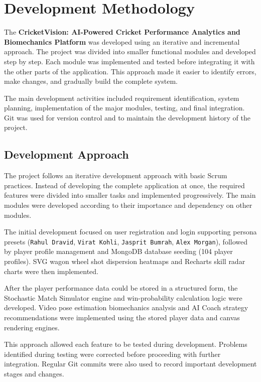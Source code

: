 \chapter{Development Methodology}

The \textbf{CricketVision: AI-Powered Cricket Performance Analytics and Biomechanics Platform} was developed using an iterative and incremental approach. The project was divided into smaller functional modules and developed step by step. Each module was implemented and tested before integrating it with the other parts of the application. This approach made it easier to identify errors, make changes, and gradually build the complete system.

The main development activities included requirement identification, system planning, implementation of the major modules, testing, and final integration. Git was used for version control and to maintain the development history of the project.

\section{Development Approach}
The project follows an iterative development approach with basic Scrum practices. Instead of developing the complete application at once, the required features were divided into smaller tasks and implemented progressively. The main modules were developed according to their importance and dependency on other modules.

The initial development focused on user registration and login supporting persona presets (\texttt{Rahul Dravid}, \texttt{Virat Kohli}, \texttt{Jasprit Bumrah}, \texttt{Alex Morgan}), followed by player profile management and MongoDB database seeding (104 player profiles). SVG wagon wheel shot dispersion heatmaps and Recharts skill radar charts were then implemented.

After the player performance data could be stored in a structured form, the Stochastic Match Simulator engine and win-probability calculation logic were developed. Video pose estimation biomechanics analysis and AI Coach strategy recommendations were implemented using the stored player data and canvas rendering engines.

This approach allowed each feature to be tested during development. Problems identified during testing were corrected before proceeding with further integration. Regular Git commits were also used to record important development stages and changes.

